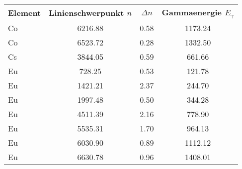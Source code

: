 \begin{tabular}{lSSS}
\toprule
Element & {Linienschwerpunkt $n$} & {$\Delta n$} & {Gammaenergie $E_{\gamma}$} \\ \midrule
Co      & 6216.88               & 0.58       & 1173.24      \\
Co      & 6523.72               & 0.28       & 1332.50      \\
Cs      & 3844.05               & 0.59       & 661.66       \\
Eu      & 728.25                & 0.53       & 121.78       \\
Eu      & 1421.21               & 2.37       & 244.70       \\
Eu      & 1997.48               & 0.50       & 344.28       \\
Eu      & 4511.39               & 2.16       & 778.90       \\
Eu      & 5535.31               & 1.70       & 964.13       \\
Eu      & 6030.90               & 0.89       & 1112.12      \\
Eu      & 6630.78               & 0.96       & 1408.01      \\ \bottomrule
\end{tabular}